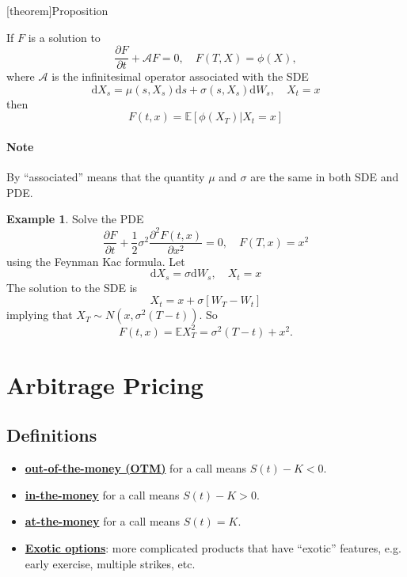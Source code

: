 \documentclass[twocolumn,landscape,10pt]{article}
\theoremstyle{definition}
\begin{document}
[theorem]{Proposition}
\begin{feynman kac}
    If $F$ is a solution to
    \[
        \frac{\partial F}{\partial t}+\mathcal{A}F=0,\quad
        F(T,X)=\phi(X),
    \]
    where $\mathcal{A}$ is the infinitesimal operator associated with the SDE
    \[
        \mathrm{d}X_s=\mu(s,X_s)\mathrm{d}s+\sigma(s,X_s)\mathrm{d}W_s,\quad
        X_t=x
    \]
    then
    \[
        F(t,x)=\mathbb{E}\left[\phi(X_T)|X_t=x\right]
    \]
\end{feynman kac}
\paragraph{Note} By ``associated'' means that the quantity $\mu$ and $\sigma$
are the same in both SDE and PDE.

\newtheorem{feynman kac eg}[theorem]{Example}
\begin{feynman kac eg}
    Solve the PDE
    \[
        \frac{\partial F}{\partial t}+\frac{1}{2}\sigma^2\frac{\partial^2
        F(t,x)}{\partial x^2}=0,\quad
        F(T,x)=x^2
    \]
    using the Feynman Kac formula. Let
    \[
        \mathrm{d}X_s=\sigma\mathrm{d}W_s,\quad X_t=x
    \]
    The solution to the SDE is
    \[
        X_t=x+\sigma\left[W_T-W_t\right]
    \]
    implying that $X_T\sim N(x,\sigma^2(T-t))$.
    So
    \[
        F(t,x)
        =\mathbb{E}X_T^2
        =\sigma^2(T-t)+x^2.
    \]
\end{feynman kac eg}

\section{Arbitrage Pricing}

\subsection{Definitions}

\begin{itemize}
    \item \textbf{\underline{out-of-the-money (OTM)}} for a call means
        $S(t)-K<0$.
    \item \textbf{\underline{in-the-money}} for a call means $S(t)-K > 0$.
    \item \textbf{\underline{at-the-money}} for a call means $S(t)=K$.
    \item \textbf{\underline{Exotic options}}: more complicated products that
        have ``exotic'' features, e.g. early exercise, multiple strikes, etc.
\end{itemize}
\end{document}
